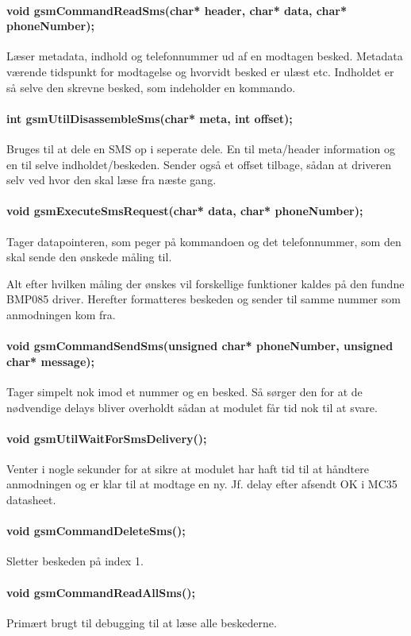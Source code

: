 \paragraph{void gsmCommandReadSms(char* header, char* data, char* phoneNumber);}
Læser metadata, indhold og telefonnummer ud af en modtagen besked. Metadata værende tidspunkt for modtagelse og hvorvidt besked er ulæst etc. Indholdet er så selve den skrevne besked, som indeholder en kommando.

\paragraph{int gsmUtilDisassembleSms(char* meta, int offset);}
Bruges til at dele en SMS op i seperate dele. En til meta/header information og en til selve indholdet/beskeden. Sender også et offset tilbage, sådan at driveren selv ved hvor den skal læse fra næste gang.

\paragraph{void gsmExecuteSmsRequest(char* data, char* phoneNumber);}
Tager datapointeren, som peger på kommandoen og det telefonnummer, som den skal sende den ønskede måling til.

Alt efter hvilken måling der ønskes vil forskellige funktioner kaldes på den fundne BMP085 driver. Herefter formatteres beskeden og sender til samme nummer som anmodningen kom fra.

\paragraph{void gsmCommandSendSms(unsigned char* phoneNumber, unsigned char* message);}
Tager simpelt nok imod et nummer og en besked. Så sørger den for at de nødvendige delays bliver overholdt sådan at modulet får tid nok til at svare.

\paragraph{void gsmUtilWaitForSmsDelivery();}
Venter i nogle sekunder for at sikre at modulet har haft tid til at håndtere anmodningen og er klar til at modtage en ny. Jf. delay efter afsendt OK i MC35 datasheet.

\paragraph{void gsmCommandDeleteSms();}
Sletter beskeden på index 1. 

\paragraph{void gsmCommandReadAllSms();}
Primært brugt til debugging til at læse alle beskederne.



